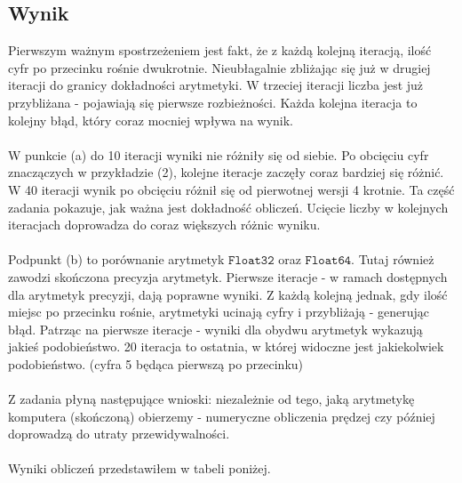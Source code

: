 \subsection{Wynik}
Pierwszym ważnym spostrzeżeniem jest fakt, że z każdą kolejną iteracją, ilość cyfr po przecinku rośnie dwukrotnie. Nieubłagalnie zbliżając się już w drugiej iteracji do granicy dokładności arytmetyki. W trzeciej iteracji liczba jest już przybliżana - pojawiają się pierwsze rozbieżności. Każda kolejna iteracja to kolejny błąd, który coraz mocniej wpływa na wynik. \\\\
W punkcie (a) do 10 iteracji wyniki nie różniły się od siebie. Po obcięciu cyfr znaczączych w przykładzie (2), kolejne iteracje zaczęły coraz bardziej się różnić. W 40 iteracji wynik po obcięciu różnił się od pierwotnej wersji 4 krotnie. Ta część zadania pokazuje, jak ważna jest dokładność obliczeń. Ucięcie liczby w kolejnych iteracjach doprowadza do coraz większych różnic wyniku. \\\\
Podpunkt (b) to porównanie arytmetyk $ \mathtt{Float32} $ oraz $ \mathtt{Float64} $. Tutaj również zawodzi skończona precyzja arytmetyk. Pierwsze iteracje - w ramach dostępnych dla arytmetyk precyzji, dają poprawne wyniki. Z każdą kolejną jednak, gdy ilość miejsc po przecinku rośnie, arytmetyki ucinają cyfry i przybliżają - generując błąd. Patrząc na pierwsze iteracje - wyniki dla obydwu arytmetyk wykazują jakieś podobieństwo. 20 iteracja to ostatnia, w której widoczne jest jakiekolwiek podobieństwo. (cyfra 5 będąca pierwszą po przecinku) \\\\
Z zadania płyną następujące wnioski: niezależnie od tego, jaką arytmetykę komputera (skończoną) obierzemy - numeryczne obliczenia prędzej czy później doprowadzą do utraty przewidywalności. \\\\
Wyniki obliczeń przedstawiłem w tabeli poniżej.
\newpage
\begin{center}
    
\end{center}